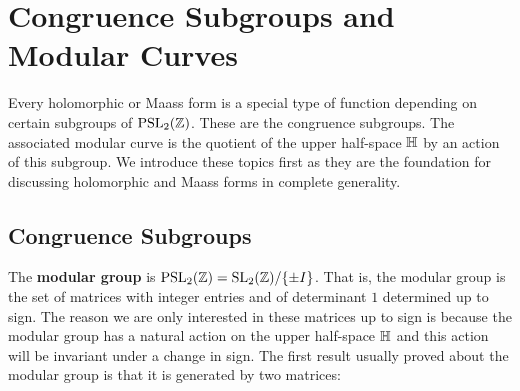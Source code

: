 \chapter{Congruence Subgroups and Modular Curves}
  Every holomorphic or Maass form is a special type of function depending on certain subgroups of $\mathrm{PSL}_{2}(\mathbb{Z})$. These are the congruence subgroups. The associated modular curve is the quotient of the upper half-space $\mathbb{H}$ by an action of this subgroup. We introduce these topics first as they are the foundation for discussing holomorphic and Maass forms in complete generality.
  \section{Congruence Subgroups}
    The \textbf{modular group} is $\mathrm{PSL}_{2}(\mathbb{Z}) = \mathrm{SL}_{2}(\mathbb{Z})/\{\pm I\}$. That is, the modular group is the set of matrices with integer entries and of determinant $1$ determined up to sign. The reason we are only interested in these matrices up to sign is because the modular group has a natural action on the upper half-space $\mathbb{H}$ and this action will be invariant under a change in sign. The first result usually proved about the modular group is that it is generated by two matrices:

